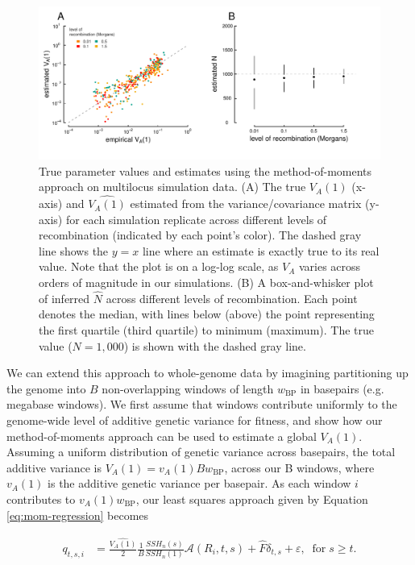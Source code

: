 \documentclass[11pt]{article}
\begin{document}
\begin{figure}
  \centering
  \includegraphics{./images/mom-fits-both.pdf} 

  \caption{True parameter values and estimates using the method-of-moments
    approach on multilocus simulation data. (A) The true $V_A(1)$ (x-axis) and
    $\widehat{V_A(1)}$ estimated from the variance/covariance matrix (y-axis)
    for each simulation replicate across different levels of recombination
    (indicated by each point's color). The dashed gray line shows the $y=x$
    line where an estimate is exactly true to its real value. Note that the
    plot is on a log-log scale, as $V_A$ varies across orders of magnitude in
    our simulations. (B) A box-and-whisker plot of inferred $\widehat{N}$
    across different levels of recombination. Each point denotes the median,
    with lines below (above) the point representing the first quartile
  (third quartile) to minimum (maximum). The true value ($N = 1,000$) is shown
with the dashed gray line.} 

\label{fig:mom-fits-both}
\end{figure}

We can extend this approach to whole-genome data by imagining partitioning up
the genome into $B$ non-overlapping windows of length $w_{\textrm{BP}}$ in
basepairs (e.g. megabase windows). We first assume that windows contribute
uniformly to the genome-wide level of additive genetic variance for  fitness,
and show how our method-of-moments approach can be used to estimate a global
$V_A(1)$. Assuming a uniform distribution of genetic variance across basepairs,
the total additive variance is $V_A(1) = v_A(1) B w_{\text{BP}}$, across our B
windows, where $v_A(1)$ is the additive genetic variance per basepair. As each
window $i$ contributes to $v_A(1) w_{\text{BP}}$, our least squares approach
given by Equation \eqref{eq:mom-regression} becomes

\begin{align}
  q_{t,s,i} &= \frac{\widehat{V_A(1)}}{2} \frac{1}{B} \frac{SSH_n(s)}{SSH_n(1)} \mathcal{A} (R_i, t,s ) +
            \widehat{F} \delta_{t,s}+ \varepsilon, \;\;  \text{for} \; s \geq t.
\end{align}
\end{document}
